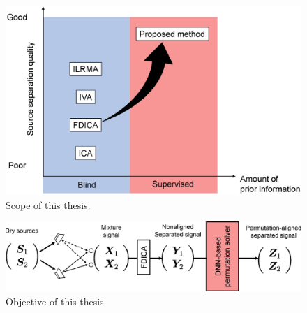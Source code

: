 \begin{figure}[t]
    \vspace{4pt}
    \begin{center}
        \includegraphics[width=1.16\columnwidth]{figures/scope.eps}
    \end{center}
    \vspace{-8pt}
	\caption{Scope of this thesis.}
	\label{fig:scope}
\end{figure}

\begin{figure}[h]
    \vspace{4pt}
    \begin{center}
        \includegraphics[width=0.9\columnwidth]{figures/topic.eps}
    \end{center}
    \vspace{-8pt}
	\caption{Objective of this thesis.}
	\label{fig:topic}
\end{figure}


